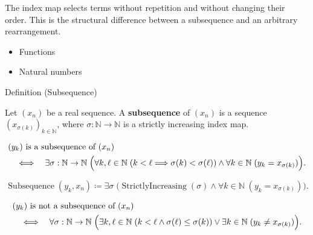 \begin{remark*}[Interpretation]
The index map selects terms without repetition and without changing their
order. This is the structural difference between a subsequence and an
arbitrary rearrangement.
\end{remark*}

\begin{dependencies}
\begin{itemize}
  \item Functions
  \item Natural numbers
\end{itemize}
\end{dependencies}


\begin{definitionbox}{Definition (Subsequence)}
\begin{definition}[Subsequence]
\label{def:subsequence}
Let $(x_n)$ be a real sequence. A \textbf{subsequence} of $(x_n)$ is a
sequence $(x_{\sigma(k)})_{k\in\mathbb{N}}$, where
$\sigma:\mathbb{N}\to\mathbb{N}$ is a strictly increasing index map.
\end{definition}
\end{definitionbox}

\begin{remark*}
\[
\begin{aligned}
&(y_k)\text{ is a subsequence of }(x_n)\\
&\quad\Longleftrightarrow\quad
\exists \sigma:\mathbb{N}\to\mathbb{N}\;
\Bigl(
  \forall k,\ell\in\mathbb{N}\;(k<\ell\Longrightarrow \sigma(k)<\sigma(\ell))
  \land
  \forall k\in\mathbb{N}\;(y_k=x_{\sigma(k)})
\Bigr).
\end{aligned}
\]
\end{remark*}

\begin{remark*}
\[
\operatorname{Subsequence}(y_k,x_n)
\coloneqq
\exists \sigma\;
\bigl(
  \operatorname{StrictlyIncreasing}(\sigma)
  \land
  \forall k\in\mathbb{N}\;(y_k=x_{\sigma(k)})
\bigr).
\]
\end{remark*}

\begin{remark*}
\[
\begin{aligned}
&(y_k)\text{ is not a subsequence of }(x_n)\\
&\quad\Longleftrightarrow\quad
\forall \sigma:\mathbb{N}\to\mathbb{N}\;
\Bigl(
  \exists k,\ell\in\mathbb{N}\;(k<\ell\land \sigma(\ell)\le\sigma(k))
  \lor
  \exists k\in\mathbb{N}\;(y_k\neq x_{\sigma(k)})
\Bigr).
\end{aligned}
\]
\end{remark*}

